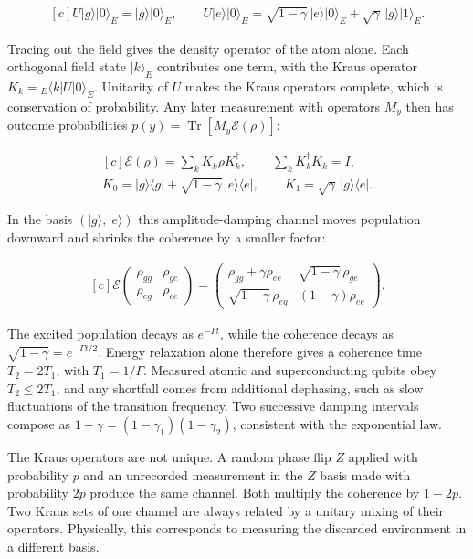 \documentclass[11pt,oneside]{book}
\newenvironment{centeredalign}{\[\begin{gathered}[c]}{\end{gathered}\]}
\begin{document}
\begin{centeredalign}
U|g\rangle|0\rangle_E=|g\rangle|0\rangle_E,\qquad
U|e\rangle|0\rangle_E=\sqrt{1-\gamma}\,|e\rangle|0\rangle_E+\sqrt{\gamma}\,|g\rangle|1\rangle_E.
\end{centeredalign}

Tracing out the field gives the density operator of the atom alone. Each orthogonal field state \(|k\rangle_E\) contributes one term, with the Kraus operator \(K_k={}_E\langle k|U|0\rangle_E\). Unitarity of \(U\) makes the Kraus operators complete, which is conservation of probability. Any later measurement with operators \(M_y\) then has outcome probabilities \(p(y)=\operatorname{Tr}[M_y\mathcal E(\rho)]\):

\begin{centeredalign}
\mathcal E(\rho)=\sum_k K_k\rho K_k^\dagger,\qquad \sum_k K_k^\dagger K_k=I,\\
K_0=|g\rangle\langle g|+\sqrt{1-\gamma}\,|e\rangle\langle e|,\qquad K_1=\sqrt{\gamma}\,|g\rangle\langle e|.
\end{centeredalign}

In the basis \((|g\rangle,|e\rangle)\) this amplitude-damping channel moves population downward and shrinks the coherence by a smaller factor:

\begin{centeredalign}
\mathcal E\begin{pmatrix}\rho_{gg}&\rho_{ge}\\ \rho_{eg}&\rho_{ee}\end{pmatrix}
=\begin{pmatrix}\rho_{gg}+\gamma\rho_{ee}&\sqrt{1-\gamma}\,\rho_{ge}\\
\sqrt{1-\gamma}\,\rho_{eg}&(1-\gamma)\rho_{ee}\end{pmatrix}.
\end{centeredalign}

The excited population decays as \(e^{-\Gamma t}\), while the coherence decays as \(\sqrt{1-\gamma}=e^{-\Gamma t/2}\). Energy relaxation alone therefore gives a coherence time \(T_2=2T_1\), with \(T_1=1/\Gamma\). Measured atomic and superconducting qubits obey \(T_2\leq2T_1\), and any shortfall comes from additional dephasing, such as slow fluctuations of the transition frequency. Two successive damping intervals compose as \(1-\gamma=(1-\gamma_1)(1-\gamma_2)\), consistent with the exponential law.

The Kraus operators are not unique. A random phase flip \(Z\) applied with probability \(p\) and an unrecorded measurement in the \(Z\) basis made with probability \(2p\) produce the same channel. Both multiply the coherence by \(1-2p\). Two Kraus sets of one channel are always related by a unitary mixing of their operators. Physically, this corresponds to measuring the discarded environment in a different basis.
\end{document}
